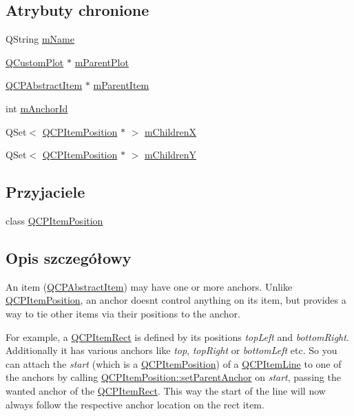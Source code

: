 \subsection*{Atrybuty chronione}
\begin{DoxyCompactItemize}
\item 
Q\+String \hyperlink{class_q_c_p_item_anchor_a23ad4d0ab0d2cbb41a7baf05bcf996ec}{m\+Name}
\item 
\hyperlink{class_q_custom_plot}{Q\+Custom\+Plot} $\ast$ \hyperlink{class_q_c_p_item_anchor_a59b968410831ba91a25cc75a77dde6f5}{m\+Parent\+Plot}
\item 
\hyperlink{class_q_c_p_abstract_item}{Q\+C\+P\+Abstract\+Item} $\ast$ \hyperlink{class_q_c_p_item_anchor_a80fad480ad3bb980446ed6ebc00818ae}{m\+Parent\+Item}
\item 
int \hyperlink{class_q_c_p_item_anchor_a00c62070333e8345976b579676ad3997}{m\+Anchor\+Id}
\item 
Q\+Set$<$ \hyperlink{class_q_c_p_item_position}{Q\+C\+P\+Item\+Position} $\ast$ $>$ \hyperlink{class_q_c_p_item_anchor_a3c0bfd6e50f3b48e2a9b3824695b20f7}{m\+ChildrenX}
\item 
Q\+Set$<$ \hyperlink{class_q_c_p_item_position}{Q\+C\+P\+Item\+Position} $\ast$ $>$ \hyperlink{class_q_c_p_item_anchor_a3abe4eebd0683454d81c8341df6f7115}{m\+ChildrenY}
\end{DoxyCompactItemize}
\subsection*{Przyjaciele}
\begin{DoxyCompactItemize}
\item 
class \hyperlink{class_q_c_p_item_anchor_aa9b8ddc062778e202a0be06a57d18d17}{Q\+C\+P\+Item\+Position}
\end{DoxyCompactItemize}


\subsection{Opis szczegółowy}
An item (\hyperlink{class_q_c_p_abstract_item}{Q\+C\+P\+Abstract\+Item}) may have one or more anchors. Unlike \hyperlink{class_q_c_p_item_position}{Q\+C\+P\+Item\+Position}, an anchor doesn\textquotesingle{}t control anything on its item, but provides a way to tie other items via their positions to the anchor.

For example, a \hyperlink{class_q_c_p_item_rect}{Q\+C\+P\+Item\+Rect} is defined by its positions {\itshape top\+Left} and {\itshape bottom\+Right}. Additionally it has various anchors like {\itshape top}, {\itshape top\+Right} or {\itshape bottom\+Left} etc. So you can attach the {\itshape start} (which is a \hyperlink{class_q_c_p_item_position}{Q\+C\+P\+Item\+Position}) of a \hyperlink{class_q_c_p_item_line}{Q\+C\+P\+Item\+Line} to one of the anchors by calling \hyperlink{class_q_c_p_item_position_ac094d67a95d2dceafa0d50b9db3a7e51}{Q\+C\+P\+Item\+Position\+::set\+Parent\+Anchor} on {\itshape start}, passing the wanted anchor of the \hyperlink{class_q_c_p_item_rect}{Q\+C\+P\+Item\+Rect}. This way the start of the line will now always follow the respective anchor location on the rect item.

